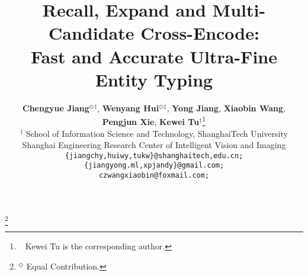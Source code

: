 \documentclass[11pt]{article}
\title{Recall, Expand and Multi-Candidate Cross-Encode: \\
Fast and Accurate Ultra-Fine Entity Typing}
\author{
    \textbf{Chengyue Jiang$^\Diamond$$^\ddagger$},
    \textbf{Wenyang Hui$^\Diamond$$^\ddagger$},
    \textbf{Yong Jiang},
    \textbf{Xiaobin Wang},
    \textbf{Pengjun Xie},
    \textbf{Kewei Tu$^\ddagger$}\thanks{$~~$ Kewei Tu is the corresponding author.} \\
    $^\ddagger$ School of Information Science and Technology, ShanghaiTech University \\
    Shanghai Engineering Research Center of Intelligent Vision and Imaging \\
    \texttt{\{jiangchy,huiwy,tukw\}@shanghaitech,edu.cn;} \\
    \texttt{\{jiangyong.ml,xpjandy\}@gmail.com;} \\
    \texttt{czwangxiaobin@foxmail.com;}
}
\newcommand\blfootnote[1]{%
  \begingroup
  \renewcommand\thefootnote{}\footnote{#1}%
  \addtocounter{footnote}{-1}%
  \endgroup
}
\begin{document}
\maketitle

\blfootnote{$^\Diamond$ Equal Contribution.}
\newcommand{\code}{\url{http://github.com/modelscope/AdaSeq/tree/master/examples/MCCE}}
\newcommand{\name}{{MCCE}}













\end{document}
